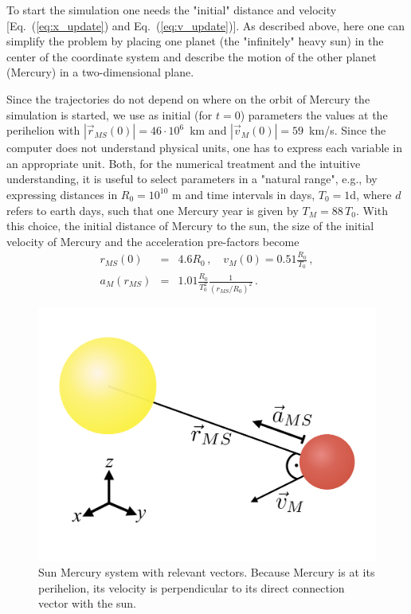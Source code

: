 \documentclass[12pt,ngerman,american]{iopart}
\newcommand{\abs}[1]{\left\vert #1 \right\vert}
\begin{document}
To start the simulation one needs the "initial" distance and velocity [Eq.~(\ref{eq:x_update}) and Eq.~(\ref{eq:v_update})].
As described above, here  one can simplify the problem by placing one planet (the "infinitely" heavy sun) in the center of the coordinate system and describe the motion of the other planet (Mercury) in a two-dimensional plane.

Since the trajectories do not depend on where on the orbit of Mercury the simulation is started, we
use as initial (for $t=0$) parameters the values at the perihelion with $ \abs{\vec r_{MS}(0)} = 46 \cdot 10^6$~km and $ \abs{\vec v_M(0)} = 59$~km/s\cite{MercuryFactSheet}.
Since the computer does not understand physical units, one has to express each variable in an appropriate unit.
Both, for the numerical treatment and the intuitive understanding, it is useful to select parameters in a "natural range", e.g.,
by expressing distances in $R_0 = 10^{10}$ m and time intervals in days, $T_0 = 1$d, where $d$ refers to earth days, such that one Mercury year is given by $T_M=88\,T_0$.
With this choice, the initial distance of Mercury to the sun, the size of the initial velocity of Mercury and the acceleration pre-factors become
\begin{eqnarray}
r_{MS}(0)   &=& 4.6 R_0 \, , \quad
v_{M}(0)    = 0.51 \frac{R_0}{T_0} \, ,  \\
a_M(r_{MS}) &=& 1.01 \frac{R_0}{T_0^2} \frac{1}{\left(r_{MS}/R_0\right)^2}
\, .
\end{eqnarray}

%
\begin{figure}[htb]
	\centering
	\includegraphics[width=.5\textwidth]{figs/sun_merc.pdf}
	\caption{\label{fig:sun_merc}%
		Sun Mercury system with relevant vectors.
		Because Mercury is at its perihelion, its velocity is perpendicular to its direct connection vector with the sun.%
	}
\end{figure}
%
\end{document}
